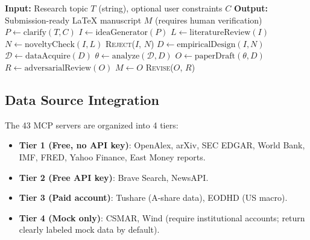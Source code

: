 \documentclass[12pt, a4paper]{article}
\begin{document}
\begin{algorithm}[htbp]
\caption{FinAI 8-stage pipeline with human-in-the-loop checkpoints}
\label{alg:pipeline}
\begin{algorithmic}[1]
\State \textbf{Input:} Research topic $T$ (string), optional user constraints $C$
\State \textbf{Output:} Submission-ready LaTeX manuscript $M$ (requires human verification)
\State $P \gets \text{clarify}(T, C)$ 
\State $I \gets \text{ideaGenerator}(P)$ 
\State $L \gets \text{literatureReview}(I)$ 
\State $N \gets \text{noveltyCheck}(I, L)$ 
    \State \Return \textsc{Reject}($I$, $N$) 
\EndIf
\State $D \gets \text{empiricalDesign}(I, N)$ 
\State $\mathcal{D} \gets \text{dataAcquire}(D)$ 
\State $\theta \gets \text{analyze}(\mathcal{D}, D)$ 
\State $O \gets \text{paperDraft}(\theta, D)$ 
\State $R \gets \text{adversarialReview}(O)$ 
    \State $M \gets O$ 
\Else
    \State \Return \textsc{Revise}($O$, $R$)
\EndIf
\end{algorithmic}
\end{algorithm}

\subsection{Data Source Integration}

The 43 MCP servers are organized into 4 tiers:

\begin{itemize}
    \item \textbf{Tier 1 (Free, no API key)}: OpenAlex, arXiv, SEC EDGAR, World Bank, IMF, FRED, Yahoo Finance, East Money reports.
    \item \textbf{Tier 2 (Free API key)}: Brave Search, NewsAPI.
    \item \textbf{Tier 3 (Paid account)}: Tushare (A-share data), EODHD (US macro).
    \item \textbf{Tier 4 (Mock only)}: CSMAR, Wind (require institutional accounts; return clearly labeled mock data by default).
\end{itemize}
\end{document}
